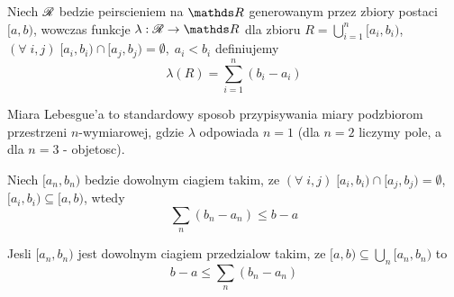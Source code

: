 \begin{multicols}{2}

    Niech $\mathcal{R}$ bedzie peirscieniem na $\R$ generowanym przez zbiory postaci $[a, b)$, wowczas funkcje $\lambda:\rodz R\to\R$ dla zbioru $R=\bigcup\limits_{i=1}^n[a_i,b_i)$, $(\forall\;i,j)\;[a_i,b_i)\cap[a_j, b_j)=\emptyset,\;a_i<b_i$ definiujemy
    $$\lambda(R)=\sum\limits_{i=1}^n(b_i-a_i)$$
    
    {\color{def}Miara Lebesgue'a} to standardowy sposob przypisywania miary podzbiorom przestrzeni $n$-wymiarowej, gdzie $\lambda$ odpowiada $n=1$ (dla $n=2$ liczymy pole, a dla $n=3$ - objetosc).\medskip

    Niech $[a_n,b_n)$ bedzie dowolnym ciagiem takim, ze $(\forall\;i, j)\;[a_i,b_i)\cap[a_j,b_j)=\emptyset$, \\$[a_i,b_i)\subseteq[a,b)$, wtedy
    $$\sum_n(b_n-a_n)\leq b-a$$

    Jesli $[a_n,b_n)$ jest dowolnym ciagiem przedzialow takim, ze $[a,b)\subseteq \bigcup_n[a_n,b_n)$ to
    $$b-a\leq \sum_n(b_n-a_n)$$
    
\end{multicols}